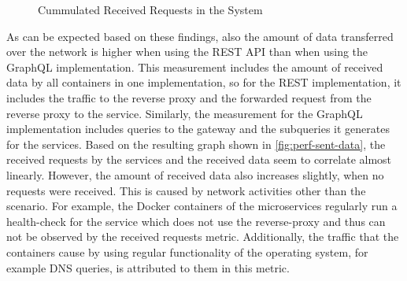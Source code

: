 \begin{figure}[htb!]
    \centering
    \caption{Cummulated Received Requests in the System}\label{fig:perf-sent-requests}    
\end{figure}

As can be expected based on these findings, also the amount of data transferred over the network is higher when using the \ac{REST} \ac{API} than when using the GraphQL implementation.
This measurement includes the amount of received data by all containers in one implementation, so for the \ac{REST} implementation, it includes the traffic to the reverse proxy and the forwarded request from the reverse proxy to the service.
Similarly, the measurement for the GraphQL implementation includes queries to the gateway and the subqueries it generates for the services.
Based on the resulting graph shown in \autoref{fig:perf-sent-data}, the received requests by the services and the received data seem to correlate almost linearly.
However, the amount of received data also increases slightly, when no requests were received.
This is caused by network activities other than the scenario.
For example, the Docker containers of the microservices regularly run a health-check for the service which does not use the reverse-proxy and thus can not be observed by the received requests metric.
Additionally, the traffic that the containers cause by using regular functionality of the operating system, for example \ac{DNS} queries, is attributed to them in this metric.

